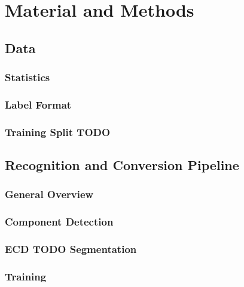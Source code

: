 \chapter{Material and Methods}

\section{Data}


\subsection{Statistics}

\subsection{Label Format}

\subsection{Training Split TODO}

\section{Recognition and Conversion Pipeline}

\subsection{General Overview}

\subsection{Component Detection}

\subsection{ECD TODO Segmentation}

\subsection{Training}

